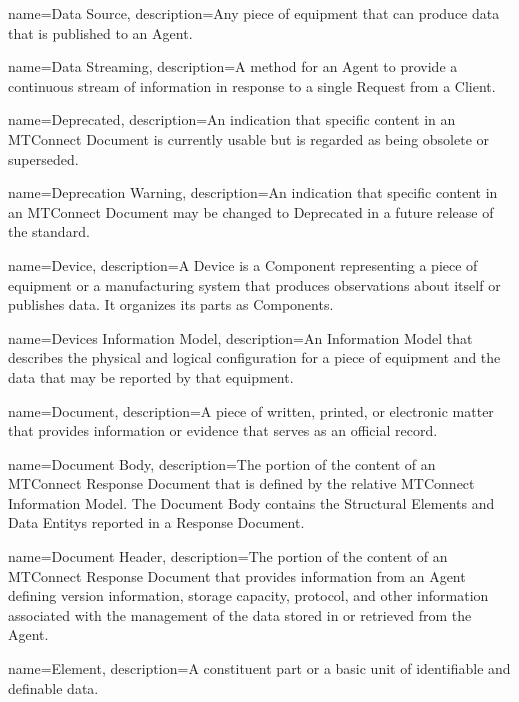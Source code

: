 {
    name={Data Source},
	description={Any piece of equipment that can produce data that is published to an \gls{Agent}.
}
}

{
    name={Data Streaming},
	description={A method for an \gls{Agent} to provide a continuous stream of information in response to a single \gls{Request} from a \gls{Client}.}
}

{
    name={Deprecated},
	description={An indication that specific content in an \gls{MTConnect Document} is currently usable but is regarded as being obsolete or superseded. }
}

{
    name={Deprecation Warning},
	description={An indication that specific content in an \gls{MTConnect Document} may be changed to \gls{Deprecated} in a future release of the standard.}
}

{
    name={Device},
	description={A \gls{Device} is a \gls{Component} representing a piece of equipment or a manufacturing system that produces observations about itself or publishes data. It organizes its parts as \glspl{Component}.}
}

{
    name={Devices Information Model},
	description={An \gls{Information Model} that describes the physical and logical configuration for a piece of equipment and the data that may be reported by that equipment. }
}

{
    name={Document},
	description={A piece of written, printed, or electronic matter that provides information or evidence that serves as an official record.}
}

{
    name={Document Body},
	description={The portion of the content of an \gls{MTConnect Response Document} that is defined by the relative \gls{MTConnect Information Model}. The \gls{Document Body} contains the \glspl{Structural Element} and \glspl{Data Entity} reported in a \gls{Response Document}.
}
}

{
    name={Document Header},
	description={The portion of the content of an \gls{MTConnect Response Document} that provides information from an \gls{Agent} defining version information, storage capacity, protocol, and other information associated with the management of the data stored in or retrieved from the \gls{Agent}.
}
}

{
    name={Element},
	description={A constituent part or a basic unit of identifiable and definable data.}
}

